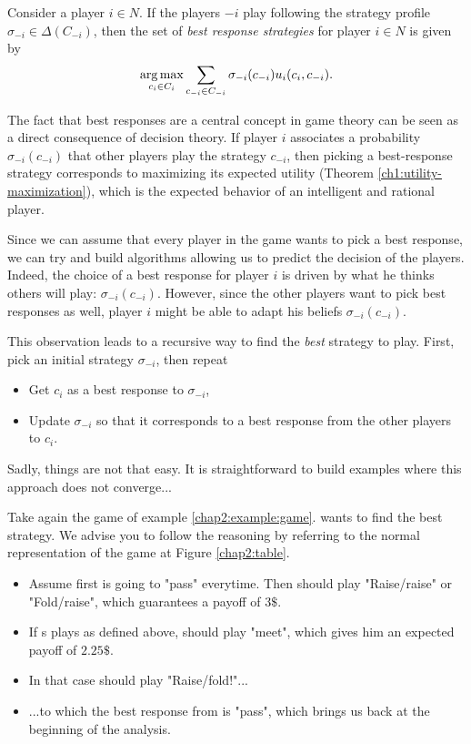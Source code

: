 \begin{definition}
Consider a player $i \in N$. If the players $-i$ play following the strategy profile $\sigma_{-i} \in \Delta(C_{-i})$, then the set of \emph{best response strategies} for player $i \in N$ is given by 
$$ \operatorname*{arg\,max}_{c_i \in C_i} \sum_{c_{-i} \in C_{-i}} \sigma_{-i}(c_{-i}) u_i(c_i, c_{-i}).$$
\end{definition} 

The fact that best responses are a central concept in game theory can be seen as a direct consequence of decision theory. If player $i$ associates a probability $\sigma_{-i}(c_{-i}) $ that other players play the strategy $c_{-i}$, then picking a best-response strategy corresponds to maximizing its expected utility (Theorem \ref{ch1:utility-maximization}), which is the expected behavior of an intelligent and rational player. 

Since we can assume that every player in the game wants to pick a best response, we can try and build algorithms allowing us to predict the decision of the players. 
Indeed, the choice of a best response for player $i$ is driven by what he thinks others will play: $\sigma_{-i}(c_{-i}) $. However, since the other players want to pick best responses as well, player $i$ might be able to adapt his beliefs $\sigma_{-i}(c_{-i}) $.

This observation leads to a recursive way to  find the \emph{best} strategy to play. First, pick an initial strategy $\sigma_{-i}$,  then repeat
\begin{itemize}
 \item Get $c_i$ as a best response to $\sigma_{-i}$, 
 \item Update $\sigma_{-i}$ so that it corresponds to a best response from the other players to $c_i$.
\end{itemize}

Sadly, things are not that easy. It is straightforward to build examples where this approach does not converge...

\begin{example}
Take again the game of example \ref{chap2:example:game}. \TAtwo{} wants to find the best strategy. We advise you to follow the reasoning by referring to the normal representation of the game at Figure \ref{chap2:table}.

\begin{itemize}
\item Assume first \TAone{} is going to "pass" everytime. Then \TAtwo{} should play "Raise/raise" or "Fold/raise", which guarantees a payoff of $3\$$.
\item If \TAtwo{}s plays as defined above, \TAone{} should play "meet", which gives him an expected payoff of $2.25\$$.
\item In that case \TAtwo{} should play "Raise/fold!"...
\item ...to which the best response from \TAone{} is "pass", which brings us back at the beginning of the analysis.
\end{itemize}

\label{chap2:example:bestresponseequilibria}
\end{example}


